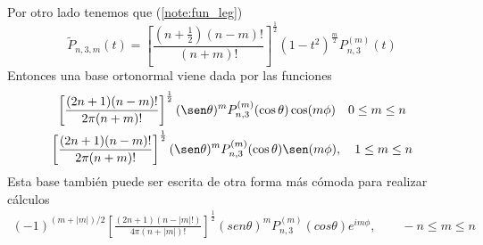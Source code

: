 Por otro lado tenemos que (\ref{note:fun_leg})
$$ 
\tilde{P}_{n,3,m}(t)= \left[\frac{(n+\frac{1}{2})(n-m)!}{(n+m)!}\right]^\frac{1}{2} (1-t^2)^{\frac{m}{2}}P_{n,3}^{(m)}(t)
$$
Entonces una base ortonormal viene dada por las funciones
\begin{gather}
\left[\frac{(2n+1)(n-m)!}{2\pi(n+m)!}\right]^{\frac{1}{2}} (\sen\theta)^{m}P_{n,3}^{(m)}(\cos\theta)\cos(m\phi) \quad 0 \le m \le n \\
\left[\frac{(2n+1)(n-m)!}{2\pi(n+m)!}\right]^{\frac{1}{2}} (\sen\theta)^{m}P_{n,3}^{(m)}(\cos\theta)\sen(m\phi), \quad 1\le m \le n 
\end{gather}
Esta base también puede ser escrita de otra forma más cómoda para realizar cálculos
\begin{gather}
(-1)^{(m+|m|)/2}\left[\frac{(2n+1)(n-|m|!)}{4\pi(n+|m|)!}\right]^{\frac{1}{2}} (sen \theta)^m P_{n,3}^{(m)}(cos\theta)e^{im\phi}, \qquad -n\le m \le n
\end{gather}
